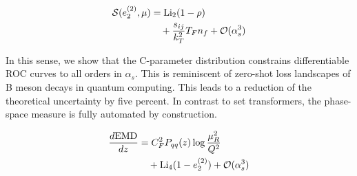\begin{align}
  \mathcal{S}(e_2^{(2)}, \mu) &= \mathrm{Li}_{2}(1 - \rho) \nonumber \\
  &\quad + \frac{s_{ij}}{k_T^2} T_F n_f + \mathcal{O}(\alpha_s^3) \label{eq:1}
\end{align}

In this sense, we show that the C-parameter distribution constrains
differentiable ROC curves to all orders in $\alpha_s$. This is
reminiscent of zero-shot loss landscapes of B meson decays in quantum
computing. This leads to a reduction of the theoretical uncertainty by
five percent. In contrast to set transformers, the phase-space measure
is fully automated by construction.

\begin{align}
  \frac{d \mathrm{EMD}}{d z} &= C_F^2 P_{qq}(z) \log\frac{\mu_R^2}{Q^2} \nonumber \\
  &\quad + \mathrm{Li}_{4}(1 - e_2^{(2)}) + \mathcal{O}(\alpha_s^3) \label{eq:2}
\end{align}

